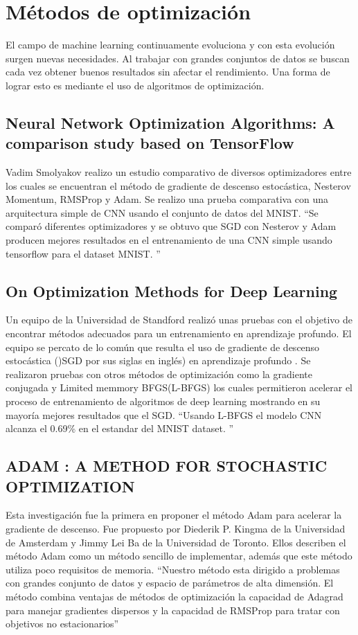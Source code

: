 \section{Métodos de optimización}
El campo de machine learning continuamente evoluciona y con esta evolución surgen nuevas necesidades. Al trabajar con grandes conjuntos de datos se buscan cada vez obtener buenos resultados sin afectar el rendimiento. Una forma de lograr esto es mediante el uso de algoritmos de optimización.
\subsection{Neural Network Optimization Algorithms: A comparison study based on TensorFlow}
Vadim Smolyakov\cite{WEBSITE:11} realizo un estudio comparativo de diversos optimizadores entre los cuales se encuentran el método de gradiente de descenso estocástica, Nesterov Momentum, RMSProp y Adam. Se realizo una prueba comparativa con una arquitectura simple de CNN usando el conjunto de datos del MNIST. \textquotedblleft Se comparó diferentes optimizadores y se obtuvo que SGD con Nesterov y Adam producen mejores resultados en el entrenamiento de una CNN simple usando tensorflow para el dataset MNIST. \textquotedblright \cite{WEBSITE:11}
\subsection{On Optimization Methods for Deep Learning}
Un equipo de la Universidad de Standford realizó unas pruebas con el objetivo de encontrar métodos adecuados para un entrenamiento en aprendizaje profundo. El equipo se percato de lo común que resulta el uso de gradiente de descenso estocástica ()SGD por sus siglas en inglés) en aprendizaje profundo . Se realizaron pruebas con otros métodos de optimización como la gradiente conjugada y Limited memmory BFGS(L-BFGS) los cuales permitieron acelerar el proceso de entrenamiento de algoritmos de deep learning mostrando en su mayoría mejores resultados que el SGD. \textquotedblleft Usando L-BFGS el modelo CNN alcanza el 0.69\%  en el estandar del MNIST dataset. \textquotedblright \cite{Optimizacion}

\subsection{ADAM : A METHOD FOR STOCHASTIC OPTIMIZATION}
Esta investigación fue la primera en proponer el método Adam para acelerar la gradiente de descenso. Fue propuesto por Diederik P. Kingma de la Universidad de Amsterdam y Jimmy Lei Ba de la Universidad de Toronto. Ellos describen el método Adam como un método sencillo de implementar, además que este método utiliza poco requisitos de memoria.
\textquotedblleft Nuestro método esta dirigido a problemas con grandes conjunto de datos y espacio de parámetros de alta dimensión. El método combina ventajas de métodos de optimización la capacidad de Adagrad para manejar gradientes dispersos y la capacidad de RMSProp para tratar con objetivos no estacionarios\textquotedblright \cite{ADAM}
